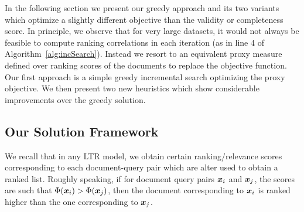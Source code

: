 

In the following section we present our greedy approach and its two variants which optimize a slightly different objective than the validity or completeness score. In principle, we observe that for very large datasets, it would not always be feasible to compute ranking correlations in each iteration (as in line 4 of Algorithm~\ref{alg:incSearch}). Instead we resort to an equivalent proxy measure defined over ranking scores of the documents to replace the objective function. Our first approach is a simple greedy incremental search optimizing the proxy objective. We then present two new heuristics which show considerable improvements over the greedy solution. 

\subsection{Our Solution Framework}
\label{sec:matrix}
We recall that in any LTR model, we obtain certain ranking/relevance scores corresponding to each document-query pair which are alter used to obtain a ranked list. Roughly speaking, if for document query pairs $\boldsymbol{x}_i$ and $\boldsymbol{x}_j$, the scores are such that $\Phi(\boldsymbol{x}_i) > \Phi(\boldsymbol{x}_j)$, then the document corresponding to $\boldsymbol{x}_i$ is ranked higher than the one corresponding to $\boldsymbol{x}_j$.

